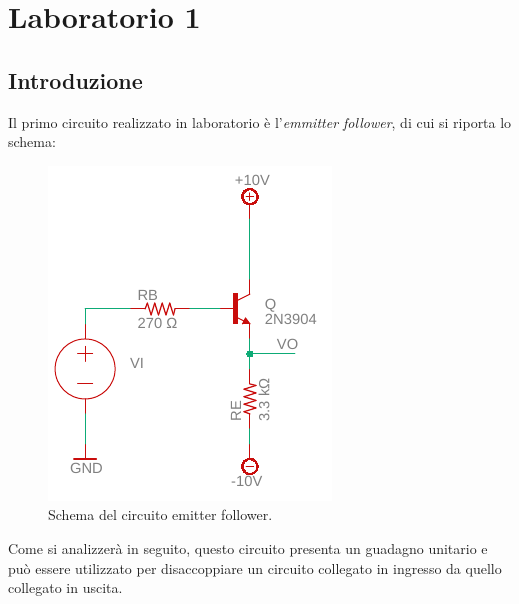 \chapter{Laboratorio 1}
\section{Introduzione}
Il primo circuito realizzato in laboratorio è l'\textit{emmitter follower}, di cui si riporta lo schema:
\begin{figure}[h!]
	\centering
	\includegraphics[width=0.4\linewidth]{./OtherFiles/Laboratorio 1/emitter follower}
	\caption{Schema del circuito emitter follower.}
	\label{fig:emitterfollwer}
\end{figure}

\noindent
Come si analizzerà in seguito, questo circuito presenta un guadagno unitario e può essere utilizzato per disaccoppiare un circuito collegato in ingresso da quello collegato in uscita.


